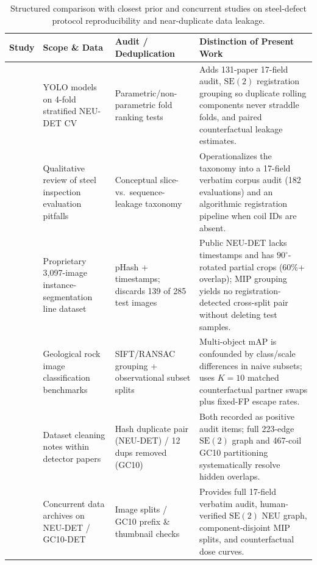 \documentclass[pdflatex,sn-apa]{sn-jnl}
\begin{document}
\begin{table}[htbp]
\centering
\footnotesize
\setlength{\tabcolsep}{3pt}
\caption{Structured comparison with closest prior and concurrent studies on steel-defect protocol reproducibility and near-duplicate data leakage.}
\label{tab:adjacent_work}
\begin{tabularx}{\textwidth}{>{\raggedright\arraybackslash}p{2.3cm} >{\raggedright\arraybackslash}p{3.0cm} >{\raggedright\arraybackslash}p{3.1cm} >{\raggedright\arraybackslash}X}
\toprule
\textbf{Study} & \textbf{Scope \& Data} & \textbf{Audit / Deduplication} & \textbf{Distinction of Present Work} \\
\midrule
\citet{lema2025reproducible} & 18 YOLO models on 4-fold stratified NEU-DET CV & Parametric/non-parametric fold ranking tests & Adds 131-paper 17-field audit, $\mathrm{SE}(2)$ registration grouping so duplicate rolling components never straddle folds, and paired counterfactual leakage estimates. \\
\citet{technologies2026review} & Qualitative review of steel inspection evaluation pitfalls & Conceptual slice- vs.\ sequence-leakage taxonomy & Operationalizes the taxonomy into a 17-field verbatim corpus audit (182 evaluations) and an algorithmic registration pipeline when coil IDs are absent. \\
\citet{molleda2026edge} & Proprietary 3,097-image instance-segmentation line dataset & pHash + timestamps; discards 139 of 285 test images & Public NEU-DET lacks timestamps and has $90^\circ$-rotated partial crops (60\%+ overlap); MIP grouping yields no registration-detected cross-split pair without deleting test samples. \\
\citet{bourezgui2026rock} & Geological rock image classification benchmarks & SIFT/RANSAC grouping + observational subset splits & Multi-object $\text{mAP}$ is confounded by class/scale differences in naive subsets; uses $K=10$ matched counterfactual partner swaps plus fixed-FP escape rates. \\
\citet{chen2026confidence,yang2026improved} & Dataset cleaning notes within detector papers & Hash duplicate pair (NEU-DET) / 12 dups removed (GC10) & Both recorded as positive audit items; full 223-edge $\mathrm{SE}(2)$ graph and 467-coil GC10 partitioning systematically resolve hidden overlaps. \\
\citet{jeong2026zenodo,li2026figshare} & Concurrent data archives on NEU-DET / GC10-DET & Image splits / GC10 prefix \& thumbnail checks & Provides full 17-field verbatim audit, human-verified $\mathrm{SE}(2)$ NEU graph, component-disjoint MIP splits, and counterfactual dose curves. \\
\bottomrule
\end{tabularx}
\end{table}
\end{document}
